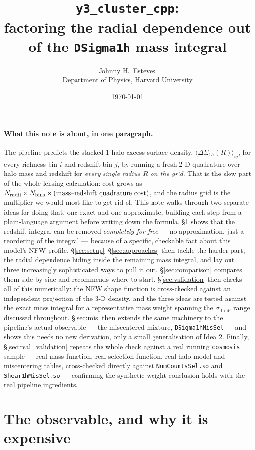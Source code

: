 \documentclass[a4paper, 11pt]{article}
\title{\texorpdfstring{%
\textcolor{harvardcrimson}{\textbf{\texttt{y3\_cluster\_cpp}:\\
factoring the radial dependence out of the \texttt{DSigma1h} mass integral}}%
}{y3_cluster_cpp: factoring the radial dependence out of the DSigma1h mass integral}}
\author{Johnny H.\ Esteves\,\orcidlink{0000-0003-4373-2386}\\[2pt]
{\small Department of Physics, Harvard University}}
\date{\today}
\newcommand{\lnM}{\ln M}
\newcommand{\DSoh}{\Delta\Sigma_{1h}}
\newcommand{\obsij}[1]{\langle \DSoh(#1)\rangle_{ij}}
\begin{document}
\maketitle
\thispagestyle{fancy}

\paragraph{What this note is about, in one paragraph.} The pipeline
predicts the stacked 1-halo excess surface density,
$\obsij{R}$, for every richness bin $i$ and redshift bin $j$, by
running a fresh 2-D quadrature over halo mass and redshift for
\emph{every single radius $R$ on the grid}. That is the slow part
of the whole lensing calculation: cost grows as
$N_{\rm radii}\times N_{\rm bins}\times(\text{mass--redshift
quadrature cost})$, and the radius grid is the multiplier we would
most like to get rid of. This note walks through two separate
ideas for doing that, one exact and one approximate, building each
step from a plain-language argument before writing down the
formula. \S\ref{sec:exact} shows that the redshift integral can be
removed \emph{completely for free} --- no approximation, just a
reordering of the integral --- because of a specific, checkable
fact about this model's NFW profile. \S\ref{sec:setup}--\S\ref{sec:approaches}
then tackle the harder part, the radial dependence hiding inside
the remaining mass integral, and lay out three increasingly
sophisticated ways to pull it out. \S\ref{sec:comparison} compares
them side by side and recommends where to start.
\S\ref{sec:validation} then checks all of this numerically: the NFW
shape function is cross-checked against an independent projection of
the 3-D density, and the three ideas are tested against the exact
mass integral for a representative mass weight spanning the
$\sigma_{\lnM}$ range discussed throughout. \S\ref{sec:mis} then
extends the same machinery to the pipeline's actual observable ---
the miscentered mixture, \texttt{DSigma1hMisSel} --- and shows this
needs no new derivation, only a small generalisation of Idea 2.
Finally, \S\ref{sec:real_validation} repeats the whole check against
a real running \texttt{cosmosis} sample --- real mass function, real
selection function, real halo-model and miscentering tables, cross-checked
directly against \texttt{NumCountsSel.so} and \texttt{Shear1hMisSel.so}
--- confirming the synthetic-weight conclusion holds with the real
pipeline ingredients.

\tableofcontents

\section{The observable, and why it is expensive}
\label{sec:exact}
\end{document}
